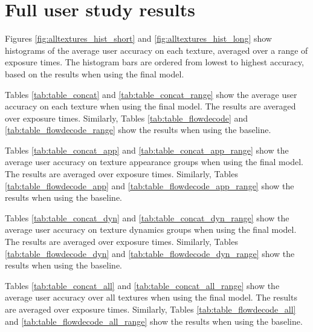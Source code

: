 \section{Full user study results}\label{sec:full_user_study_results}
Figures \ref{fig:alltextures_hist_short} and \ref{fig:alltextures_hist_long}
show histograms of the average user accuracy on each texture, averaged over a 
range of exposure times. The histogram bars are ordered from lowest
to highest accuracy, based on the results when using the final model.

Tables \ref{tab:table_concat} and \ref{tab:table_concat_range} show
the average user accuracy on each texture when using the final model.
The results are averaged over exposure times. Similarly, Tables
\ref{tab:table_flowdecode} and \ref{tab:table_flowdecode_range} show the results
when using the baseline.

Tables \ref{tab:table_concat_app} and \ref{tab:table_concat_app_range} show
the average user accuracy on texture appearance groups when using the
final model. The results are averaged over exposure times. Similarly, Tables
\ref{tab:table_flowdecode_app} and \ref{tab:table_flowdecode_app_range} show the results when using the baseline.

Tables \ref{tab:table_concat_dyn} and \ref{tab:table_concat_dyn_range} show
the average user accuracy on texture dynamics groups when using the
final model. The results are averaged over exposure times. Similarly, Tables
\ref{tab:table_flowdecode_dyn} and \ref{tab:table_flowdecode_dyn_range} show the results when using the baseline.

Tables \ref{tab:table_concat_all} and \ref{tab:table_concat_all_range} show
the average user accuracy over all textures when using the
final model. The results are averaged over exposure times. Similarly, Tables
\ref{tab:table_flowdecode_all} and \ref{tab:table_flowdecode_all_range} show the results when using the baseline.